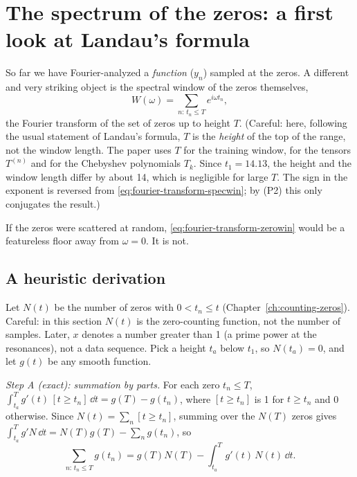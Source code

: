 \section{The spectrum of the zeros: a first look at Landau's formula}\label{sec:fourier-transform-landau}

So far we have Fourier-analyzed a \emph{function} ($y_n$) sampled at the zeros. A different and very striking object is the spectral window of the zeros themselves,
\begin{equation}
W(\omega)=\sum_{n:\,t_n\le T}e^{i\omega t_n},
\label{eq:fourier-transform-zerowin}
\end{equation}
the Fourier transform of the set of zeros up to height $T$. (Careful: here, following the usual statement of Landau's formula, $T$ is the \emph{height} of the top of the range, not the window length. The paper uses $T$ for the training window, for the tensors $T^{(n)}$ and for the Chebyshev polynomials $T_k$. Since $t_1=14.13$, the height and the window length differ by about 14, which is negligible for large $T$. The sign in the exponent is reversed from \eqref{eq:fourier-transform-specwin}; by (P2) this only conjugates the result.)

If the zeros were scattered at random, \eqref{eq:fourier-transform-zerowin} would be a featureless floor away from $\omega=0$. It is not.

\subsection{A heuristic derivation}

Let $N(t)$ be the number of zeros with $0<t_n\le t$ (Chapter~\ref{ch:counting-zeros}). Careful: in this section $N(t)$ is the zero-counting function, not the number of samples. Later, $x$ denotes a number greater than 1 (a prime power at the resonances), not a data sequence. Pick a height $t_a$ below $t_1$, so $N(t_a)=0$, and let $g(t)$ be any smooth function.

\emph{Step A (exact): summation by parts.} For each zero $t_n\le T$, $\int_{t_a}^{T}g'(t)\,[t\ge t_n]\,\dd t=g(T)-g(t_n)$, where $[t\ge t_n]$ is 1 for $t\ge t_n$ and 0 otherwise. Since $N(t)=\sum_n[t\ge t_n]$, summing over the $N(T)$ zeros gives $\int_{t_a}^Tg'N\,\dd t=N(T)g(T)-\sum_ng(t_n)$, so
\begin{equation}
\sum_{n:\,t_n\le T}g(t_n)=g(T)N(T)-\int_{t_a}^{T}g'(t)\,N(t)\,\dd t .
\label{eq:fourier-transform-sbp}
\end{equation}

